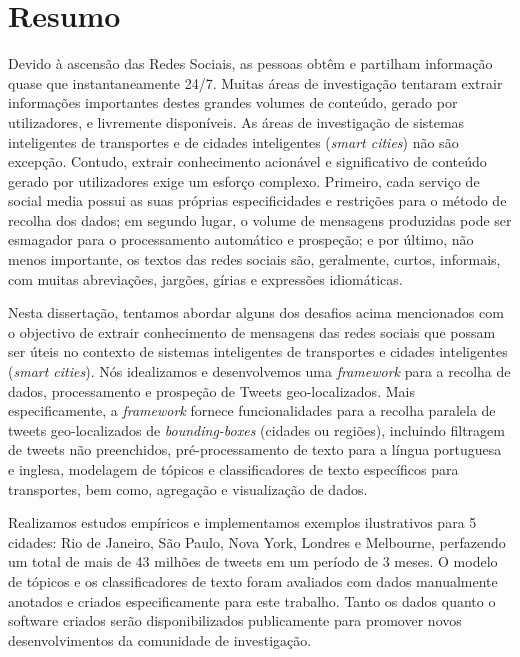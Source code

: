 \chapter*{Resumo}

Devido à ascensão das Redes Sociais, as pessoas obtêm e partilham informação quase que instantaneamente 24/7. Muitas áreas de investigação tentaram extrair informações importantes destes grandes volumes de conteúdo, gerado por utilizadores, e livremente disponíveis. As áreas de investigação de sistemas inteligentes de transportes e de cidades inteligentes (\textit{smart cities}) não são excepção. Contudo, extrair conhecimento acionável e significativo de conteúdo gerado por utilizadores exige um esforço complexo. Primeiro, cada serviço de social media possui as suas próprias especificidades e restrições para o método de recolha dos dados; em segundo lugar, o volume de mensagens produzidas pode ser esmagador para o processamento automático e prospeção; e por último, não menos importante, os textos das redes sociais são, geralmente, curtos, informais, com muitas abreviações, jargões, gírias e expressões idiomáticas. 

Nesta dissertação, tentamos abordar alguns dos desafios acima mencionados com o objectivo de extrair conhecimento de mensagens das redes sociais que possam ser úteis no contexto de sistemas inteligentes de transportes e cidades inteligentes (\textit{smart cities}). Nós idealizamos e desenvolvemos uma \textit{framework} para a recolha de dados, processamento e prospeção de Tweets geo-localizados. Mais especificamente, a \textit{framework} fornece funcionalidades para a recolha paralela de tweets geo-localizados de \textit{bounding-boxes} (cidades ou regiões), incluindo filtragem de tweets não preenchidos, pré-processamento de texto para a língua portuguesa e inglesa, modelagem de tópicos e classificadores de texto específicos para transportes, bem como, agregação e visualização de dados.

Realizamos estudos empíricos e implementamos exemplos ilustrativos para 5 cidades: Rio de Janeiro, São Paulo, Nova York, Londres e Melbourne, perfazendo um total de mais de 43 milhões de tweets em um período de 3 meses. O modelo de tópicos e os classificadores de texto foram avaliados com dados manualmente anotados e criados especificamente para este trabalho. Tanto os dados quanto o software criados serão disponibilizados publicamente para promover novos desenvolvimentos da comunidade de investigação.